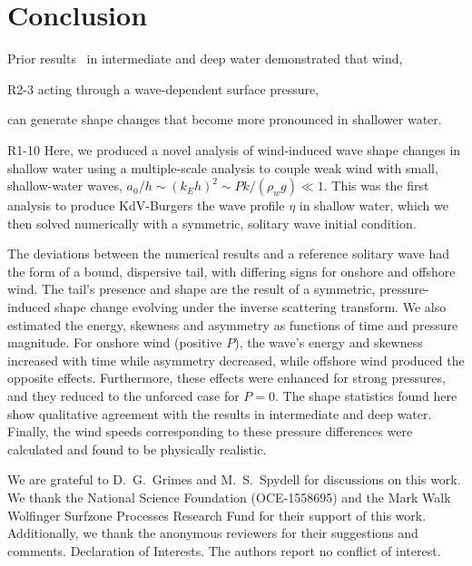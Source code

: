 \documentclass{jfm}
\begin{document}
\section{\label{sec:conclusion} Conclusion}
Prior results~\citep{zdyrski2020wind} in intermediate and deep water
demonstrated that wind,
\begin{LineLabel}{R2-3}
acting through a wave-dependent surface pressure,
\end{LineLabel}
can generate shape changes that become more pronounced in
shallower water.
\begin{LineLabel}{R1-10}
Here, we produced a novel analysis of wind-induced wave shape changes in
shallow water using a multiple-scale analysis to couple weak wind with
small, shallow-water waves, \ie{} $a_0/h \sim (k_E h)^2 \sim P k/(\rho_w
g) \ll 1$.
This was the first analysis to produce KdV-Burgers the wave profile
$\eta$ in shallow water, which we then solved numerically with a
symmetric, solitary wave initial condition.
\end{LineLabel}
The deviations between the numerical results and a reference solitary
wave had the form of a bound, dispersive tail, with differing signs for
onshore and offshore wind.
The tail's presence and shape are the result of a symmetric,
pressure-induced shape change evolving under the inverse scattering
transform.
We also estimated the energy, skewness and
asymmetry as functions of time and pressure magnitude.
For onshore wind (positive $P$), the wave's energy and skewness
increased with time while asymmetry decreased, while offshore wind
produced the opposite effects.
Furthermore, these effects were enhanced for strong pressures, and they
reduced to the unforced case for $P=0$.
The shape statistics found here show qualitative agreement with the
results in intermediate and deep water.
Finally, the wind speeds corresponding to these pressure differences
were calculated and found to be physically realistic.

\begin{acknowledgements}
We are grateful to D.~G.~Grimes and M.~S.~Spydell for discussions on
this work.
We thank the National Science Foundation (OCE-1558695) and the Mark Walk
Wolfinger Surfzone Processes Research Fund for their support of this
work.
Additionally, we thank the anonymous reviewers for their suggestions and
comments.
Declaration of Interests. The authors report no conflict of interest.
\end{acknowledgements}



\end{document}
